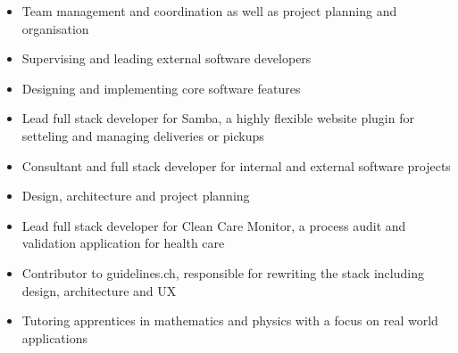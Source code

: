 \documentclass[10pt,a4paper]{altacv}
\begin{document}

\begin{fullwidth}
\makecvheader
\end{fullwidth}


\begin{itemize}
\item Team management and coordination as well as project planning and organisation
\item Supervising and leading external software developers
\item Designing and implementing core software features
\end{itemize}
\divider

\begin{itemize}
\item Lead full stack developer for Samba, a highly flexible website plugin for setteling and managing deliveries or pickups
\item Consultant and full stack developer for internal and external software projects
\end{itemize}
\divider

\begin{itemize}
\item Design, architecture and project planning
\item Lead full stack developer for Clean Care Monitor, a process audit and validation application for health care
\item Contributor to guidelines.ch, responsible for rewriting the stack including design, architecture and UX
\end{itemize}
\divider

\begin{itemize}
\item Tutoring apprentices in mathematics and physics with a focus on real world applications
\end{itemize}
\divider
\end{document}
